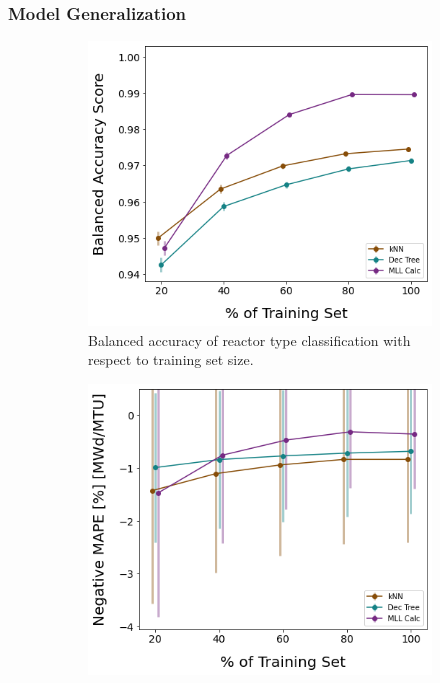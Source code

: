 
\subsubsection{Model Generalization}

\begin{figure}[!htb]
  \centering
  \begin{subfigure}[b]{0.49\textwidth}
    \centering
    \includegraphics[width=\textwidth]{./chapters/exp1/learncurve_nuc29_err05_BalAcc_rxtr.png}
    \caption{Balanced accuracy of reactor type classification with respect 
             to training set size.}
    \label{fig:learnsA}
  \end{subfigure}
  \hfill
  \begin{subfigure}[b]{0.49\textwidth}
    \centering
    \includegraphics[width=\textwidth]{./chapters/exp1/learncurve_nuc29_err05_MAPE_burn.png}

\end{subfigure}
\end{figure}
